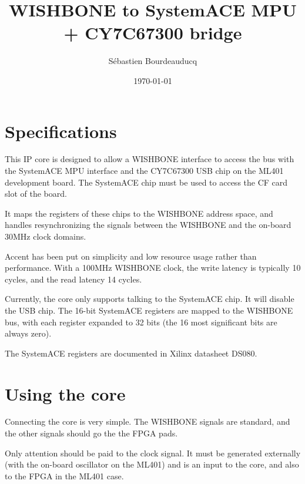 \documentclass[a4paper,11pt]{article}
\title{WISHBONE to SystemACE MPU + CY7C67300 bridge}
\author{S\'ebastien Bourdeauducq}
\date{\today}
\begin{document}
\maketitle{}
\section{Specifications}
This IP core is designed to allow a WISHBONE interface to access the bus with the SystemACE MPU interface and the CY7C67300 USB chip on the ML401 development board. The SystemACE chip must be used to access the CF card slot of the board.

It maps the registers of these chips to the WISHBONE address space, and handles resynchronizing the signals between the WISHBONE and the on-board 30MHz clock domains.

Accent has been put on simplicity and low resource usage rather than performance. With a 100MHz WISHBONE clock, the write latency is typically 10 cycles, and the read latency 14 cycles.

Currently, the core only supports talking to the SystemACE chip. It will disable the USB chip. The 16-bit SystemACE registers are mapped to the WISHBONE bus, with each register expanded to 32 bits (the 16 most significant bits are always zero).

The SystemACE registers are documented in Xilinx datasheet DS080.

\section{Using the core}
Connecting the core is very simple. The WISHBONE signals are standard, and the other signals should go the the FPGA pads.

Only attention should be paid to the clock signal. It must be generated externally (with the on-board oscillator on the ML401) and is an input to the core, and also to the FPGA in the ML401 case.
\end{document}

